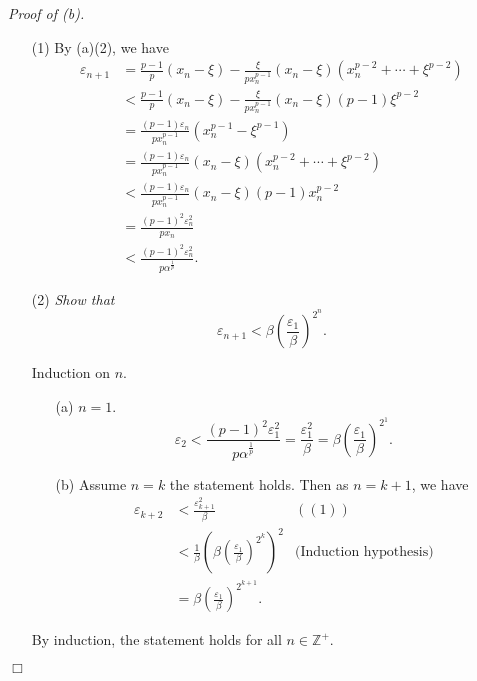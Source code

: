 \documentclass{article}
\begin{document}
\emph{Proof of (b).}
\begin{enumerate}
\item[(1)]
  By (a)(2), we have
  \begin{align*}
    \varepsilon_{n+1}
    &= \frac{p-1}{p} (x_n-\xi)
      - \frac{\xi}{p x_n^{p-1}}(x_n - \xi)( x_n^{p-2} + \cdots + \xi^{p-2} ) \\
    &< \frac{p-1}{p} (x_n-\xi)
      - \frac{\xi}{p x_n^{p-1}}(x_n-\xi) (p-1)\xi^{p-2} \\
    &= \frac{(p-1)\varepsilon_n}{p x_n^{p-1}}( x_n^{p-1} - \xi^{p-1}) \\
    &= \frac{(p-1)\varepsilon_n}{p x_n^{p-1}}(x_n - \xi)( x_n^{p-2} + \cdots + \xi^{p-2} ) \\
    &< \frac{(p-1)\varepsilon_n}{p x_n^{p-1}}(x_n - \xi)(p-1)x_n^{p-2} \\
    &= \frac{(p-1)^2\varepsilon_n^2}{p x_n} \\
    &< \frac{(p-1)^2\varepsilon_n^2}{p \alpha^{\frac{1}{p}}}.
  \end{align*}
\item[(2)]
\emph{Show that
$$\varepsilon_{n+1}
< \beta \left( \frac{\varepsilon_1}{\beta} \right)^{2^n}.$$}

Induction on $n$.
  \begin{enumerate}
  \item[(a)]
  $n = 1$.
  $$\varepsilon_2
  < \frac{(p-1)^2\varepsilon_1^2}{p \alpha^{\frac{1}{p}}}
  = \frac{\varepsilon_1^2}{\beta}
  = \beta \left( \frac{\varepsilon_1}{\beta} \right)^{2^1}.$$
  \item[(b)]
  Assume $n=k$ the statement holds.
  Then as $n=k+1$, we have
  \begin{align*}
    \varepsilon_{k+2}
    &< \frac{\varepsilon_{k+1}^2}{\beta}
      &((1)) \\
    &< \frac{1}{\beta} \left( \beta \left( \frac{\varepsilon_1}{\beta} \right)^{2^k} \right)^2
      &\text{(Induction hypothesis)}\\
    &= \beta \left( \frac{\varepsilon_1}{\beta} \right)^{2^{k+1}}.
  \end{align*}
  \end{enumerate}
  By induction, the statement holds for all $n \in \mathbb{Z}^+$.
\end{enumerate}
$\Box$ \\\\



\end{document}

